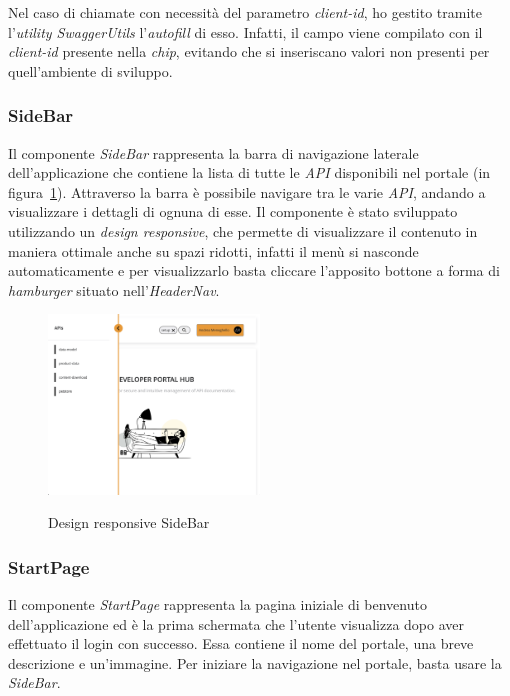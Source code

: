\pagebreak

Nel caso di chiamate con necessità del parametro \textit{client-id}, ho gestito tramite l'\textit{utility SwaggerUtils} l'\textit{autofill} di esso.
Infatti, il campo viene compilato con il \textit{client-id} presente nella \textit{chip}, evitando che si inseriscano valori non presenti per 
quell'ambiente di sviluppo.


\subsubsection{SideBar}\label{subsubsec:side-bar}
Il componente \textit{SideBar} rappresenta la barra di navigazione laterale dell'applicazione che contiene la lista di tutte le \textit{API} disponibili nel portale (in figura~\ref{fig:side-bar-responsive}).
Attraverso la barra è possibile navigare tra le varie \textit{API}, andando a visualizzare i dettagli di ognuna di esse. 
Il componente è stato sviluppato utilizzando un \textit{design responsive}, che permette di visualizzare il contenuto in maniera ottimale anche su spazi ridotti, 
infatti il menù si nasconde automaticamente e per visualizzarlo basta cliccare l'apposito bottone a forma di \textit{hamburger} situato nell'\textit{HeaderNav}.\\

\begin{figure}[ht]
  \centering
  \includegraphics[width=0.5\textwidth, alt={Design responsive della barra laterale}]{images/frontend/Sidebar.jpg}
  \caption{Design responsive SideBar}\label{fig:side-bar-responsive}
\end{figure}

\subsubsection{StartPage}\label{subsubsec:start-page}
Il componente \textit{StartPage} rappresenta la pagina iniziale di benvenuto dell'applicazione ed è la prima schermata che l'utente visualizza dopo aver effettuato il login con successo.
Essa contiene il nome del portale, una breve descrizione e un'immagine. Per iniziare la navigazione nel portale, basta usare la \textit{SideBar}.

